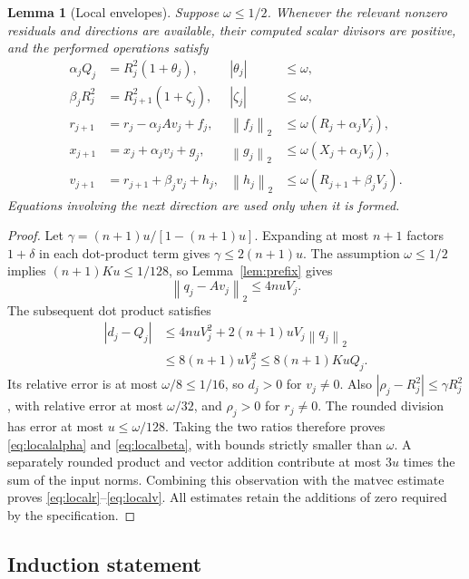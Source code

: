 \documentclass[11pt]{article}
\newtheorem{lemma}[theorem]{Lemma}
\theoremstyle{remark}\newtheorem{remark}[theorem]{Remark}
\newcommand{\norm}[1]{\left\lVert#1\right\rVert_2}
\begin{document}
\begin{lemma}[Local envelopes]\label{lem:local}
Suppose $\omega\le1/2$. Whenever the relevant nonzero residuals and
directions are available, their computed scalar divisors are positive,
and the performed operations satisfy
\begin{align}
\alpha_jQ_j&=R_j^2(1+\theta_j),&|\theta_j|&\le\omega,\label{eq:localalpha}\\
\beta_jR_j^2&=R_{j+1}^2(1+\zeta_j),&|\zeta_j|&\le\omega,\label{eq:localbeta}\\
r_{j+1}&=r_j-\alpha_jAv_j+f_j,&
\norm{f_j}&\le\omega(R_j+\alpha_jV_j),\label{eq:localr}\\
x_{j+1}&=x_j+\alpha_jv_j+g_j,&
\norm{g_j}&\le\omega(X_j+\alpha_jV_j),\label{eq:localx}\\
v_{j+1}&=r_{j+1}+\beta_jv_j+h_j,&
\norm{h_j}&\le\omega(R_{j+1}+\beta_jV_j).\label{eq:localv}
\end{align}
Equations involving the next direction are used only when it is formed.
\end{lemma}
\begin{proof}
Let $\gamma=(n+1)u/[1-(n+1)u]$. Expanding at most $n+1$ factors
$1+\delta$ in each dot-product term gives
$\gamma\le2(n+1)u$. The assumption $\omega\le1/2$ implies
$(n+1)Ku\le1/128$, so Lemma~\ref{lem:prefix} gives
\[
\norm{q_j-Av_j}\le4nuV_j.
\]
The subsequent dot product satisfies
\begin{align*}
|d_j-Q_j|
&\le4nuV_j^2+2(n+1)uV_j\norm{q_j}\\
&\le8(n+1)uV_j^2\le8(n+1)KuQ_j.
\end{align*}
Its relative error is at most $\omega/8\le1/16$, so $d_j>0$ for
$v_j\ne0$. Also $|\rho_j-R_j^2|\le\gamma R_j^2$, with relative error
at most $\omega/32$, and $\rho_j>0$ for $r_j\ne0$.
The rounded division has error at most $u\le\omega/128$.
Taking the two ratios therefore proves \eqref{eq:localalpha} and
\eqref{eq:localbeta}, with bounds strictly smaller than $\omega$.
A separately rounded product and vector addition contribute at most
$3u$ times the sum of the input norms. Combining this observation with
the matvec estimate proves \eqref{eq:localr}--\eqref{eq:localv}.
All estimates retain the additions of zero required by the specification.
\end{proof}

\subsection{Induction statement}
\end{document}
